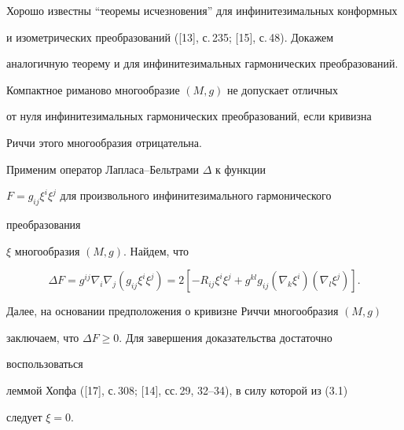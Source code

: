  


Хорошо известны ``теоремы исчезновения'' для инфинитезимальных конформных 


и изометрических преобразований ([13], с.\,235; [15], с.\,48). Докажем 


аналогичную теорему и для инфинитезимальных гармонических преобразований. 


 


\begin{thms} 


Компактное риманово многообразие $(M,g)$ не допускает отличных 


от нуля инфинитезимальных гармонических преобразований, если кривизна 


Риччи этого многообразия отрицательна. 


\end{thms} 


 


\begin{pf} 


Применим оператор Лапласа--Бельтрами $\Delta$ к функции 


$F=g_{ij}\xi^i\xi^j$ для произвольного инфинитезимального гармонического 


преобразования 


$\xi$ многообразия $(M,g)$. Найдем, что 


\begin{equation} 


\Delta F=g^{ij}\nabla_i\nabla_j(g_{ij}\xi^i\xi^j)= 


2[-R_{ij}\xi^i\xi^j+g^{kl}g_{ij} 


(\nabla_k\xi^i)(\nabla_l\xi^j)]. 


\end{equation} 


Далее, на основании предположения о кривизне Риччи многообразия $(M,g)$ 


заключаем, что $\Delta F\ge0$. Для завершения доказательства достаточно 


воспользоваться 


леммой Хопфа ([17], с.\,308; [14], сс.\,29, 32--34), в силу которой из (3.1) 


следует $\xi=0$. 


\end{pf} 


 


 


